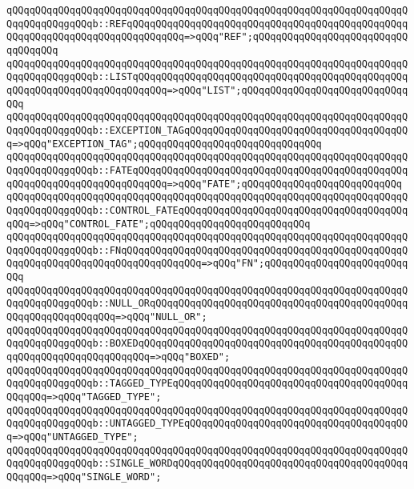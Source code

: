 \verb|qQQqqQQqqQQqqQQqqQQqqQQqqQQqqQQqqQQqqQQqqQQqqQQqqQQqqQQqqQQqqQQqqQQqqQQqqQQqqQQqgqQQqb::REFqQQqqQQqqQQqqQQqqQQqqQQqqQQqqQQqqQQqqQQqqQQqqQQqqQQqqQQqqQQqqQQqqQQqqQQqqQQqqQQq=>qQQq"REF";qQQqqQQqqQQqqQQqqQQqqQQqqQQqqQQqqQQq|\newline
\verb|qQQqqQQqqQQqqQQqqQQqqQQqqQQqqQQqqQQqqQQqqQQqqQQqqQQqqQQqqQQqqQQqqQQqqQQqqQQqqQQqgqQQqb::LISTqQQqqQQqqQQqqQQqqQQqqQQqqQQqqQQqqQQqqQQqqQQqqQQqqQQqqQQqqQQqqQQqqQQqqQQqqQQq=>qQQq"LIST";qQQqqQQqqQQqqQQqqQQqqQQqqQQqqQQq|\newline
\verb|qQQqqQQqqQQqqQQqqQQqqQQqqQQqqQQqqQQqqQQqqQQqqQQqqQQqqQQqqQQqqQQqqQQqqQQqqQQqqQQqgqQQqb::EXCEPTION_TAGqQQqqQQqqQQqqQQqqQQqqQQqqQQqqQQqqQQqqQQq=>qQQq"EXCEPTION_TAG";qQQqqQQqqQQqqQQqqQQqqQQqqQQqqQQq|\newline
\verb|qQQqqQQqqQQqqQQqqQQqqQQqqQQqqQQqqQQqqQQqqQQqqQQqqQQqqQQqqQQqqQQqqQQqqQQqqQQqqQQqgqQQqb::FATEqQQqqQQqqQQqqQQqqQQqqQQqqQQqqQQqqQQqqQQqqQQqqQQqqQQqqQQqqQQqqQQqqQQqqQQqqQQq=>qQQq"FATE";qQQqqQQqqQQqqQQqqQQqqQQqqQQq|\newline
\verb|qQQqqQQqqQQqqQQqqQQqqQQqqQQqqQQqqQQqqQQqqQQqqQQqqQQqqQQqqQQqqQQqqQQqqQQqqQQqqQQqgqQQqb::CONTROL_FATEqQQqqQQqqQQqqQQqqQQqqQQqqQQqqQQqqQQqqQQqqQQq=>qQQq"CONTROL_FATE";qQQqqQQqqQQqqQQqqQQqqQQqqQQq|\newline
\verb|qQQqqQQqqQQqqQQqqQQqqQQqqQQqqQQqqQQqqQQqqQQqqQQqqQQqqQQqqQQqqQQqqQQqqQQqqQQqqQQqgqQQqb::FNqQQqqQQqqQQqqQQqqQQqqQQqqQQqqQQqqQQqqQQqqQQqqQQqqQQqqQQqqQQqqQQqqQQqqQQqqQQqqQQqqQQq=>qQQq"FN";qQQqqQQqqQQqqQQqqQQqqQQqqQQq|\newline
\verb|qQQqqQQqqQQqqQQqqQQqqQQqqQQqqQQqqQQqqQQqqQQqqQQqqQQqqQQqqQQqqQQqqQQqqQQqqQQqqQQqgqQQqb::NULL_ORqQQqqQQqqQQqqQQqqQQqqQQqqQQqqQQqqQQqqQQqqQQqqQQqqQQqqQQqqQQqqQQq=>qQQq"NULL_OR";|\newline
\verb|qQQqqQQqqQQqqQQqqQQqqQQqqQQqqQQqqQQqqQQqqQQqqQQqqQQqqQQqqQQqqQQqqQQqqQQqqQQqqQQqgqQQqb::BOXEDqQQqqQQqqQQqqQQqqQQqqQQqqQQqqQQqqQQqqQQqqQQqqQQqqQQqqQQqqQQqqQQqqQQqqQQq=>qQQq"BOXED";|\newline
\verb|qQQqqQQqqQQqqQQqqQQqqQQqqQQqqQQqqQQqqQQqqQQqqQQqqQQqqQQqqQQqqQQqqQQqqQQqqQQqqQQqgqQQqb::TAGGED_TYPEqQQqqQQqqQQqqQQqqQQqqQQqqQQqqQQqqQQqqQQqqQQqqQQq=>qQQq"TAGGED_TYPE";|\newline
\verb|qQQqqQQqqQQqqQQqqQQqqQQqqQQqqQQqqQQqqQQqqQQqqQQqqQQqqQQqqQQqqQQqqQQqqQQqqQQqqQQqgqQQqb::UNTAGGED_TYPEqQQqqQQqqQQqqQQqqQQqqQQqqQQqqQQqqQQqqQQq=>qQQq"UNTAGGED_TYPE";|\newline
\verb|qQQqqQQqqQQqqQQqqQQqqQQqqQQqqQQqqQQqqQQqqQQqqQQqqQQqqQQqqQQqqQQqqQQqqQQqqQQqqQQqgqQQqb::SINGLE_WORDqQQqqQQqqQQqqQQqqQQqqQQqqQQqqQQqqQQqqQQqqQQqqQQq=>qQQq"SINGLE_WORD";|\newline

